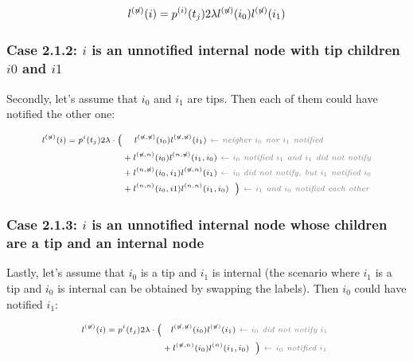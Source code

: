 \documentclass[a4paper,10pt]{article}
\begin{document}
\begin{equation}
\scriptsize
l^{(\not{n})}(i) = p^{(i)}(t_j) 2\lambda l^{(\not{n})}(i_0)l^{(\not{n})}(i_1) \label{eq:lu-int-int}
\end{equation}

\subsubsection*{Case 2.1.2: $i$ is an unnotified internal node with tip children $i0$ and $i1$}

Secondly, let's assume that $i_0$ and $i_1$ are tips. Then each of them could have notified the other one:

\begin{equation}
\scriptsize
\begin{split}
l^{(\not{n})}(i) = p^{i}(t_j) 2\lambda \cdot 
\Big(&~~~~l^{(\not{n},\not{n})}(i_0)l^{(\not{n},\not{n})}(i_1) \textit{\color{gray}~$\leftarrow$ neigher $i_0$ nor $i_1$ notified} \\
&+ l^{(\not{n},n)}(i_0)l^{(n,\not{n})}(i_1,i_0) \textit{\color{gray}~$\leftarrow$ $i_0$ notified $i_1$ and $i_1$ did not notify} \\
&+ l^{(n,\not{n})}(i_0,i_1)l^{(\not{n},n)}(i_1) \textit{\color{gray}~$\leftarrow$ $i_0$ did not notify, but $i_1$ notified $i_0$} \\
&+ l^{(n,n)}(i_0,i1)l^{(n,n)}(i_1,i_0)~~\Big) \textit{\color{gray}~$\leftarrow$ $i_1$ and $i_0$ notified each other} \\
\end{split}\label{eq:lu-tip-tip}
\end{equation}

\subsubsection*{Case 2.1.3: $i$ is an unnotified internal node whose children are a tip and an internal node}
Lastly, let's assume that $i_0$ is a tip and $i_1$ is internal (the scenario where $i_1$ is a tip and $i_0$ is internal can be obtained by swapping the labels). Then $i_0$ could have notified $i_1$:


\begin{equation}
\scriptsize
\begin{split}
l^{(\not{n})}(i) = p^{i}(t_j) 2\lambda \cdot 
\Big(&~~~l^{(\not{n},\not{n})}(i_0)l^{(\not{n})}(i_1) \textit{\color{gray}~$\leftarrow$ $i_0$ did not notify $i_1$ } \\
&+ l^{(\not{n},n)}(i_0)l^{(n)}(i_1,i_0)~~\Big) \textit{\color{gray}~$\leftarrow$ $i_0$ notified $i_1$} \\
\end{split}\label{eq:lu-int-tip}
\end{equation}
\end{document}
